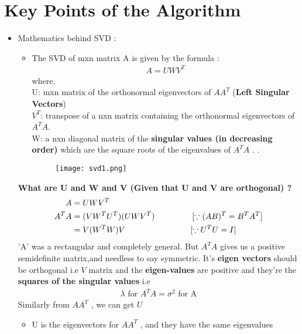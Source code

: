 \documentclass[a4paper, 11pt]{article}
\begin{document}
\section{Key Points of the Algorithm}
\begin{itemize}
    \item Mathematics behind SVD :
    \begin{itemize}
        \item The SVD of  mxn matrix A is given by the formula :
        \begin{align}
            A = UWV^T 
        \end{align}
        where,\\
         U:  mxn matrix of the orthonormal eigenvectors of $AA^{T}$ (\textbf{Left Singular Vectors})  \\
        $V^T$: transpose of a nxn matrix containing the orthonormal eigenvectors of $A^{T}A$.\\  
        W:   a nxn diagonal matrix of the \textbf{singular values (in decreasing order)} which are the square roots of the eigenvalues of $A^{T}A$          .         .
        \begin{figure}[h!]
            \centering
            \texttt{[image: svd1.png]}
            \label{fig:svd1}
          \end{figure}
    \end{itemize}
    \textbf{What are U and W and V (Given that U and V are orthogonal) ?} 
    \begin{align}
        A &= UWV^T \\
        A^TA &= (VW^TU^T)(UWV^T)  \hspace{16mm}[\because (AB)^T = B^TA^T]\\
             &= V(W^TW)V   \hspace{28mm}[\because U^TU = I]
    \end{align}
    'A' was a rectangular and completely general. But $A^TA$ gives us a positive semidefinite matrix,and needless to say symmetric. 
    It's \textbf{eigen vectors} should be orthogonal i.e $V$ matrix and the \textbf{eigen-values} are positive and they're the \textbf{squares of the singular values} i.e
    \begin{align}
       \lambda \text{ for $A^TA$} = \sigma^2 \text{ for A}
    \end{align}
    Similarly from $AA^T$ , we can get $U$
    \begin{itemize}
        \item U is the eigenvectors for $AA^T$ , and they have the same eigenvalues

\end{itemize}
\end{itemize}
\end{document}
